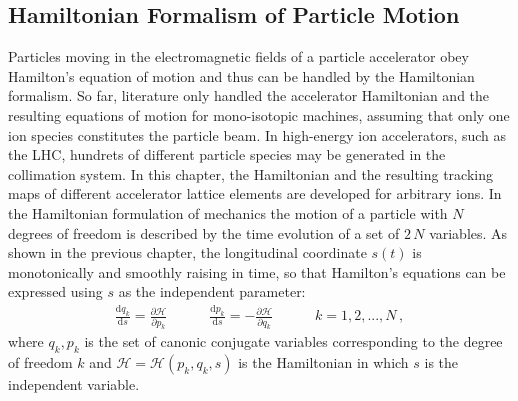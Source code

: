 %
\subsection{Hamiltonian Formalism of Particle Motion}
Particles moving in the electromagnetic fields of a particle accelerator obey Hamilton's equation of motion and thus can be handled by the Hamiltonian formalism. So far, literature only handled the accelerator Hamiltonian and the resulting equations of motion for mono-isotopic machines, assuming that only one ion species constitutes the particle beam. In high-energy ion accelerators, such as the LHC, hundrets of different particle species may be generated in the collimation system. In this chapter, the Hamiltonian and the resulting tracking maps of different accelerator lattice elements are developed for arbitrary ions. 
%
%
%
%
 In the Hamiltonian formulation of mechanics the motion of a particle with $N$ degrees of freedom is described by the time evolution of a set of $2\,N$ variables. As shown in the previous chapter, the longitudinal coordinate $s(t)$ is monotonically and smoothly raising in time, so that Hamilton's equations can be expressed using $s$ as the independent parameter:
\begin{align}
\frac{\mathrm{d} q_k}{\mathrm{d}s} = \frac{\partial \mathcal{H}}{\partial p_k} \quad \quad \quad \frac{\mathrm{d} p_k}{\mathrm{d}s} = -\frac{\partial \mathcal{H}}{\partial q_k} \quad \quad \quad k=1,2,...,N\, ,
\end{align}
where $q_k,p_k$ is the set of canonic conjugate variables corresponding to the degree of freedom $k$ and $\mathcal{H}=\mathcal{H}(p_k,q_k,s)$ is the Hamiltonian in which $s$ is the independent variable.

